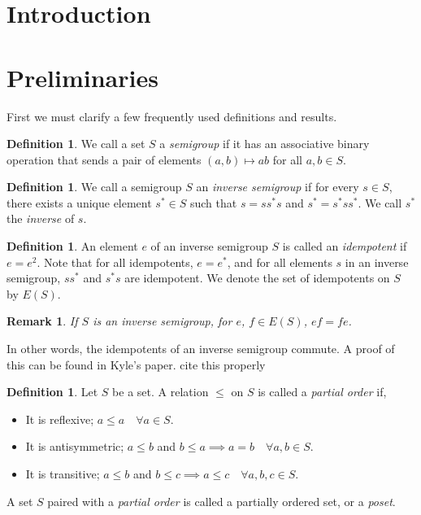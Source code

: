 \documentclass{article}
\newtheorem{remark}[theorem]{Remark}
\theoremstyle{definition}
\newtheorem{definition}[theorem]{Definition}
\begin{document}
\section{Introduction}
\section{Preliminaries}
First we must clarify a few frequently used definitions and results.

\begin{definition}
    We call a set $S$ a \textit{semigroup} if it has an associative binary operation
    that sends a pair of elements $(a, b) \mapsto ab$ for all $a, b \in S$.
\end{definition}

\begin{definition}
    We call a semigroup $S$ an \textit{inverse semigroup} if for every $s \in S$, there exists a unique
    element $s^* \in S$ such that $s = ss^*s$ and $s^* = s^*ss^*$. We call $s^*$ the \textit{inverse} of $s$.
\end{definition}

\begin{definition}
    An element $e$ of an inverse semigroup $S$ is called an \textit{idempotent} if
    $e = e^2$. Note that for all idempotents, $e = e^*$, and for all elements $s$ in
    an inverse semigroup, $ss^*$ and $s^*s$ are idempotent. We denote the set of idempotents
    on $S$ by $E(S)$.
\end{definition}

\begin{remark}
    If $S$ is an inverse semigroup, for $e$, $f \in E(S)$, $ef = fe$.
\end{remark}
In other words, the idempotents of an inverse semigroup commute. A proof of this can be found in Kyle's paper. cite this properly

\begin{definition}
    Let $S$ be a set. A relation $\leq$ on $S$ is called a \textit{partial order} if,
    \begin{itemize}
        \item It is reflexive; $a \leq a \quad \forall a \in S$.
        \item It is antisymmetric; $a \leq b$ and $b \leq a \implies a = b \quad \forall a, b \in S$.
        \item It is transitive; $a \leq b$ and $b \leq c \implies a \leq c \quad \forall a, b, c \in S$.
    \end{itemize}
    A set $S$ paired with a \textit{partial order} is called a partially ordered set, or a \textit{poset}.
\end{definition}
\end{document}
